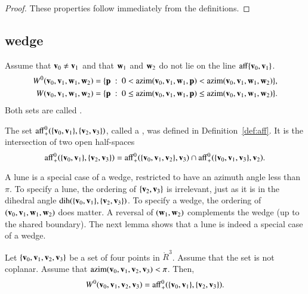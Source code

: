 \begin{proof}
These properties follow immediately from the definitions.
\end{proof}



\subsection{wedge}
%


\begin{definition}[wedge]
Assume that ${\mathbf v}_0\ne {\mathbf v}_1$ and that
${\mathbf w}_1$ and ${\mathbf w}_2$ do not lie on
the line ${\operatorname{aff}}\{{\mathbf v}_0,{\mathbf v}_1\}$.  
\begin{align*}
W^0(\v_0,\v_1,\w_1,\w_2) &= 
\{\p %
\mid 
0< \op{azim}(\v_0,\v_1,\w_1,\p) < \op{azim}(\v_0,\v_1,\w_1,\w_2)\},\\
W(\v_0,\v_1,\w_1,\w_2) &= 
\{\p \mid 
0\le \op{azim}(\v_0,\v_1,\w_1,\p) \le \op{azim}(\v_0,\v_1,\w_1,\w_2)\}.\\
\end{align*}
Both sets are called .
\end{definition}

\begin{definition}[lune]
The set ${\operatorname{aff}}^0_+(\{{\mathbf v}_0,{\mathbf v}_1\},\{{\mathbf v}_2,{\mathbf v}_3\})$, called a , was defined
in Definition~\ref{def:aff}.  It is the intersection
of two open half-spaces
\[ 
{\operatorname{aff}}^0_+(\{{\mathbf v}_0,{\mathbf v}_1\},\{{\mathbf v}_2,{\mathbf v}_3\})
={\operatorname{aff}}^0_+(\{{\mathbf v}_0,{\mathbf v}_1,{\mathbf v}_2\},{\mathbf v}_3)\cap
{\operatorname{aff}}^0_+(\{{\mathbf v}_0,{\mathbf v}_1,{\mathbf v}_3\},{\mathbf v}_2).
\] 
\end{definition}

A lune is a special case of a wedge, restricted to have an azimuth angle
less than $\pi$.  To specify a lune, the ordering of $\{{\mathbf v}_2,{\mathbf v}_3\}$
is irrelevant, just as it is in the dihedral angle 
$\operatorname{dih}(\{{\mathbf v}_0,{\mathbf v}_1\},\{{\mathbf v}_2,{\mathbf v}_3\})$.  To specify a wedge, the ordering
of $({\mathbf v}_0,{\mathbf v}_1,{\mathbf w}_1,{\mathbf w}_2)$ does matter.  A reversal of $({\mathbf w}_1,{\mathbf w}_2)$ complements
the wedge (up to the shared boundary).  The next lemma shows that
a lune is indeed a special case of a wedge.
%
%
%
%
%
%

\begin{lemma} Let $\{{\mathbf v}_0,{\mathbf v}_1,{\mathbf v}_2,{\mathbf v}_3\}$ be a set of four points
in $\ring{R}^3$.  Assume that the set is not coplanar.  Assume that
${\operatorname{azim}}({\mathbf v}_0,{\mathbf v}_1,{\mathbf v}_2,{\mathbf v}_3)<\pi$.  Then,
\[ W^0({\mathbf v}_0,{\mathbf v}_1,{\mathbf v}_2,{\mathbf v}_3) =
{\operatorname{aff}}^0_+(\{{\mathbf v}_0,{\mathbf v}_1\},\{{\mathbf v}_2,{\mathbf v}_3\}).\] 
%
\end{lemma}


